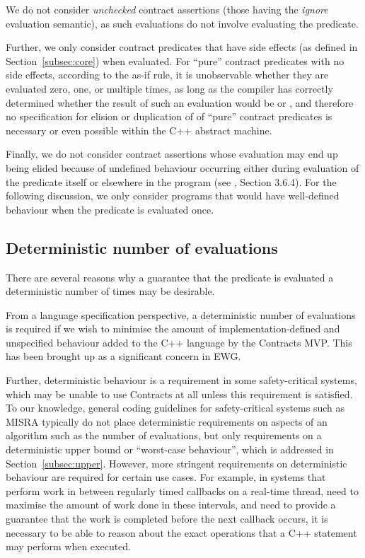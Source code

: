 We do not consider \emph{unchecked} contract assertions (those having the \emph{ignore} evaluation semantic), as such evaluations do not involve evaluating the predicate.

Further, we only consider contract predicates that have side effects (as defined in Section~\ref{subsec:core}) when evaluated. For ``pure'' contract predicates with no side effects, according to the as-if rule, it is unobservable whether they are evaluated zero, one, or multiple times, as long as the compiler has correctly determined whether the result of such an evaluation would be  or , and therefore no specification for elision or duplication of of ``pure'' contract predicates is necessary or even possible within the C++ abstract machine.

Finally, we do not consider contract assertions whose evaluation may end up being elided because of undefined behaviour occurring either during evaluation of the predicate itself or elsewhere in the program (see \cite{P2900R6}, Section 3.6.4). For the following discussion, we only consider programs that would have well-defined behaviour when the predicate is evaluated once.

\subsection{Deterministic number of evaluations}
\label{subsec:determ}
There are several reasons why a guarantee that the predicate is evaluated a deterministic number of times may be desirable.

From a language specification perspective, a deterministic number of evaluations is required if we wish to minimise the amount of implementation-defined and unspecified behaviour added to the C++ language by the Contracts MVP. This has been brought up as a significant concern in EWG.

Further, deterministic behaviour is a requirement in some safety-critical systems, which may be unable to use Contracts at all unless this requirement is satisfied.  To our knowledge, general coding guidelines for safety-critical systems such as MISRA typically do not place deterministic requirements on aspects of an algorithm such as the number of evaluations, but only requirements on a deterministic upper bound or ``worst-case behaviour'', which is addressed in Section~\ref{subsec:upper}. However, more stringent  requirements on deterministic behaviour are required for certain use cases. For example, in systems that perform work in between regularly timed callbacks on a real-time thread, need to maximise the amount of work done in these intervals, and need to provide a guarantee that the work is completed before the next callback occurs, it is necessary to be able to reason about the exact operations that a C++ statement may perform when executed.

